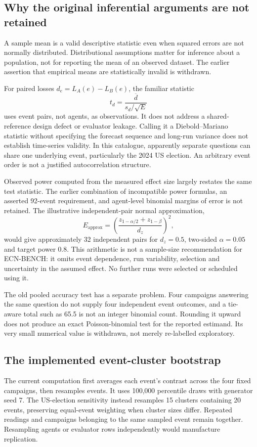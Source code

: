 \subsection{Why the original inferential arguments are not retained}
\label{sec:statistics}
\label{sec:power_limitation}
A sample mean is a valid descriptive statistic even when squared errors are not normally distributed. Distributional assumptions matter for inference about a population, not for reporting the mean of an observed dataset. The earlier assertion that empirical means are statistically invalid is withdrawn.

For paired losses $d_e=L_A(e)-L_B(e)$, the familiar statistic
\[
t_d=\frac{\overline d}{s_d/\sqrt{E}}
\]
uses event pairs, not agents, as observations. It does not address a shared-reference design defect or evaluator leakage. Calling it a Diebold--Mariano statistic without specifying the forecast sequence and long-run variance does not establish time-series validity. In this catalogue, apparently separate questions can share one underlying event, particularly the 2024 US election. An arbitrary event order is not a justified autocorrelation structure.

Observed power computed from the measured effect size largely restates the same test statistic. The earlier combination of incompatible power formulas, an asserted 92-event requirement, and agent-level binomial margins of error is not retained. The illustrative independent-pair normal approximation,
\[
E_{\mathrm{approx}}=\left(
  \frac{z_{1-\alpha/2}+z_{1-\beta}}{d_z}
\right)^2 ,
\]
would give approximately 32 independent pairs for $d_z=0.5$, two-sided $\alpha=0.05$ and target power 0.8. This arithmetic is not a sample-size recommendation for ECN-BENCH: it omits event dependence, run variability, selection and uncertainty in the assumed effect. No further runs were selected or scheduled using it.

The old pooled accuracy test has a separate problem. Four campaigns answering the same question do not supply four independent event outcomes, and a tie-aware total such as 65.5 is not an integer binomial count. Rounding it upward does not produce an exact Poisson-binomial test for the reported estimand. Its very small numerical value is withdrawn, not merely re-labelled exploratory.

\subsection{The implemented event-cluster bootstrap}
The current computation first averages each event's contrast across the four fixed campaigns, then resamples events. It uses 100,000 percentile draws with generator seed 7. The US-election sensitivity instead resamples 15 clusters containing 20 events, preserving equal-event weighting when cluster sizes differ. Repeated readings and campaigns belonging to the same sampled event remain together. Resampling agents or evaluator rows independently would manufacture replication.

